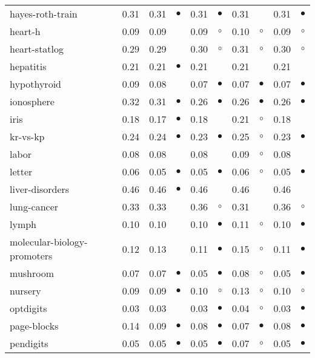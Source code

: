 {\begin{longtable}{lrr@{\hspace{0.1cm}}cr@{\hspace{0.1cm}}cr@{\hspace{0.1cm}}cr@{\hspace{0.1cm}}c}
hayes-roth-train & 0.31 & 0.31 & $\bullet$ & 0.31 &  $\bullet$ & 0.31 &           & 0.31 &  $\bullet$\\
heart-h & 0.09 & 0.09 &           & 0.09 &    $\circ$ & 0.10 &   $\circ$ & 0.09 &    $\circ$\\
heart-statlog & 0.29 & 0.29 &           & 0.30 &    $\circ$ & 0.31 &   $\circ$ & 0.30 &    $\circ$\\
hepatitis & 0.21 & 0.21 & $\bullet$ & 0.21 &            & 0.21 &           & 0.21 &           \\
hypothyroid & 0.09 & 0.08 &           & 0.07 &  $\bullet$ & 0.07 & $\bullet$ & 0.07 &  $\bullet$\\
ionosphere & 0.32 & 0.31 & $\bullet$ & 0.26 &  $\bullet$ & 0.26 & $\bullet$ & 0.26 &  $\bullet$\\
iris & 0.18 & 0.17 & $\bullet$ & 0.18 &            & 0.21 &   $\circ$ & 0.18 &           \\
kr-vs-kp & 0.24 & 0.24 & $\bullet$ & 0.23 &  $\bullet$ & 0.25 &   $\circ$ & 0.23 &  $\bullet$\\
labor & 0.08 & 0.08 &           & 0.08 &            & 0.09 &   $\circ$ & 0.08 &           \\
letter & 0.06 & 0.05 & $\bullet$ & 0.05 &  $\bullet$ & 0.06 &   $\circ$ & 0.05 &  $\bullet$\\
liver-disorders & 0.46 & 0.46 & $\bullet$ & 0.46 &            & 0.46 &           & 0.46 &           \\
lung-cancer & 0.33 & 0.33 &           & 0.36 &    $\circ$ & 0.31 &           & 0.36 &    $\circ$\\
lymph & 0.10 & 0.10 &           & 0.10 &  $\bullet$ & 0.11 &   $\circ$ & 0.10 &  $\bullet$\\
molecular-biology-promoters & 0.12 & 0.13 &           & 0.11 &  $\bullet$ & 0.15 &   $\circ$ & 0.11 &  $\bullet$\\
mushroom & 0.07 & 0.07 & $\bullet$ & 0.05 &  $\bullet$ & 0.08 &   $\circ$ & 0.05 &  $\bullet$\\
nursery & 0.09 & 0.09 & $\bullet$ & 0.10 &    $\circ$ & 0.13 &   $\circ$ & 0.10 &    $\circ$\\
optdigits & 0.03 & 0.03 &           & 0.03 &  $\bullet$ & 0.04 &   $\circ$ & 0.03 &  $\bullet$\\
page-blocks & 0.14 & 0.09 & $\bullet$ & 0.08 &  $\bullet$ & 0.07 & $\bullet$ & 0.08 &  $\bullet$\\
pendigits & 0.05 & 0.05 & $\bullet$ & 0.05 &  $\bullet$ & 0.07 &   $\circ$ & 0.05 &  $\bullet$\\

\end{longtable}}
